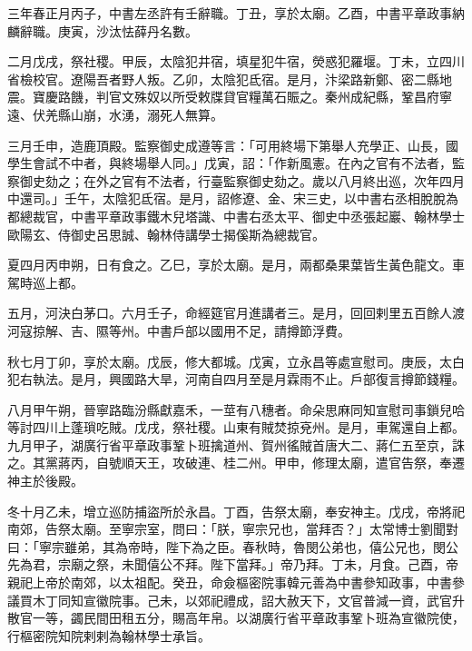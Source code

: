 
\begin{pinyinscope}

 三年春正月丙子，中書左丞許有壬辭職。丁丑，享於太廟。乙酉，中書平章政事納麟辭職。庚寅，沙汰怯薛丹名數。



 二月戊戌，祭社稷。甲辰，太陰犯井宿，填星犯牛宿，熒惑犯羅堰。丁未，立四川省檢校官。遼陽吾者野人叛。乙卯，太陰犯氐宿。是月，汴梁路新鄭、密二縣地震。寶慶路饑，判官文殊奴以所受敕牒貸官糧萬石賑之。秦州成紀縣，鞏昌府寧遠、伏羌縣山崩，水湧，溺死人無算。



 三月壬申，造鹿頂殿。監察御史成遵等言：「可用終場下第舉人充學正、山長，國學生會試不中者，與終場舉人同。」戊寅，詔：「作新風憲。在內之官有不法者，監察御史劾之；在外之官有不法者，行臺監察御史劾之。歲以八月終出巡，次年四月中還司。」壬午，太陰犯氐宿。是月，詔修遼、金、宋三史，以中書右丞相脫脫為都總裁官，中書平章政事鐵木兒塔識、中書右丞太平、御史中丞張起巖、翰林學士歐陽玄、侍御史呂思誠、翰林侍講學士揭傒斯為總裁官。



 夏四月丙申朔，日有食之。乙巳，享於太廟。是月，兩都桑果葉皆生黃色龍文。車駕時巡上都。



 五月，河決白茅口。六月壬子，命經筵官月進講者三。是月，回回剌里五百餘人渡河寇掠解、吉、隰等州。中書戶部以國用不足，請撙節浮費。



 秋七月丁卯，享於太廟。戊辰，修大都城。戊寅，立永昌等處宣慰司。庚辰，太白犯右執法。是月，興國路大旱，河南自四月至是月霖雨不止。戶部復言撙節錢糧。



 八月甲午朔，晉寧路臨汾縣獻嘉禾，一莖有八穗者。命朵思麻同知宣慰司事鎖兒哈等討四川上蓬瑣吃賊。戊戌，祭社稷。山東有賊焚掠兗州。是月，車駕還自上都。九月甲子，湖廣行省平章政事鞏卜班擒道州、賀州徭賊首唐大二、蔣仁五至京，誅之。其黨蔣丙，自號順天王，攻破連、桂二州。甲申，修理太廟，遣官告祭，奉遷神主於後殿。



 冬十月乙未，增立巡防捕盜所於永昌。丁酉，告祭太廟，奉安神主。戊戌，帝將祀南郊，告祭太廟。至寧宗室，問曰：「朕，寧宗兄也，當拜否？」太常博士劉聞對曰：「寧宗雖弟，其為帝時，陛下為之臣。春秋時，魯閔公弟也，僖公兄也，閔公先為君，宗廟之祭，未聞僖公不拜。陛下當拜。」帝乃拜。丁未，月食。己酉，帝親祀上帝於南郊，以太祖配。癸丑，命僉樞密院事韓元善為中書參知政事，中書參議買木丁同知宣徽院事。己未，以郊祀禮成，詔大赦天下，文官普減一資，武官升散官一等，蠲民間田租五分，賜高年帛。以湖廣行省平章政事鞏卜班為宣徽院使，行樞密院知院剌剌為翰林學士承旨。




\end{pinyinscope}

